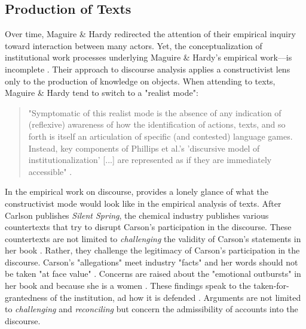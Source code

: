 
\subsection*{Production of Texts}

Over time, Maguire \& Hardy redirected the attention of their empirical inquiry toward interaction between many actors. Yet, the conceptualization of institutional work processes underlying Maguire \& Hardy's empirical work--\citet{Phillips2004}--is incomplete \citep{Lok2006}. Their approach to discourse analysis applies a constructivist lens only to the production of knowledge on objects. When attending to texts, Maguire \& Hardy tend to switch to a "realist mode":

\begin{quote}
	"Symptomatic of this realist mode is the absence of any indication of (reflexive) awareness of how the identification of actions, texts, and so forth is itself an articulation of specific (and contested) language games. Instead, key components of Phillips et al.'s 'discursive model of institutionalization' [...] are represented as if they are immediately accessible" \citep[p. 478]{Lok2006}.
\end{quote}

In the empirical work on discourse, \citet{Maguire2009} provides a lonely glance of what the constructivist mode would look like in the empirical analysis of texts. After Carlson publishes \textit{Silent Spring}, the chemical industry publishes various countertexts that try to disrupt Carson's participation in the discourse. These countertexts are not limited to \textit{challenging} the validity of Carson's statements in her book \citep[cf.][]{Maguire2006}. Rather, they challenge the legitimacy of Carson's participation in the discourse. Carson's "allegations" meet industry "facts" and her words should not be taken "at face value" \citep[p. 165]{Maguire2009}. Concerns are raised about the "emotional outbursts" in her book and because she is a women \citep[p. 166]{Nicolini2009}. These findings speak to the taken-for-grantedness of the institution, ad how it is defended \citep{Steele2021}. Arguments are not limited to \textit{challenging} and \textit{reconciling} \citep{Maguire2006} but concern the admissibility of accounts into the discourse.

